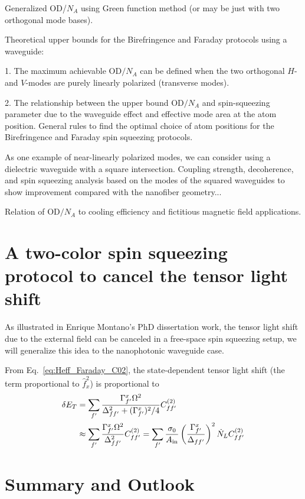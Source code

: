 \documentclass[preprint,aps,pra,onecolumn,superscriptaddress]{revtex4-1} %
\newcommand{\Ain}{A_{\rm in}}
\begin{document}
Generalized OD/$N_A$ using Green function method (or may be just with two orthogonal mode bases).

Theoretical upper bounds for the Birefringence and Faraday protocols using a waveguide:

1. The maximum achievable OD$ /N_A $ can be defined when the two orthogonal $ H $- and $ V $-modes are purely linearly polarized (transverse modes).

2. The relationship between the upper bound OD$ /N_A $ and spin-squeezing parameter due to the waveguide effect and effective mode area at the atom position. 
General rules to find the optimal choice of atom positions for the Birefringence and Faraday spin squeezing protocols.


As one example of near-linearly polarized modes, we can consider using a dielectric waveguide with a square intersection. 
Coupling strength, decoherence, and spin squeezing analysis based on the modes of the squared waveguides to show improvement compared with the nanofiber geometry...

Relation of OD$ /N_A $ to cooling efficiency and fictitious magnetic field applications.


\section{A two-color spin squeezing protocol to cancel the tensor light shift}
As illustrated in Enrique Montano's PhD dissertation work, the tensor light shift due to the external field can be canceled in a free-space spin squeezing setup, we will generalize this idea to the nanophotonic waveguide case.

From Eq.~\eqref{eq:Heff_Faraday_C02}, the state-dependent tensor light shift (the term proportional to $ \hat{f}_x^2 $) is proportional to 
\begin{align}
\delta E_T &= \sum_{f'} \frac{\Gamma_{f'}^x\Omega^2}{\Delta_{ff'}^2+(\Gamma_{f'}^x)^2/4}C_{ff'}^{(2)}\\
&\approx \sum_{f'}\frac{\Gamma_{f'}^x\Omega^2}{\Delta_{ff'}^2}C_{ff'}^{(2)} = \sum_{f'}\frac{\sigma_0}{\Ain}\left(\frac{\Gamma_{f'}^x}{\Delta_{ff'}} \right)^2 \dot{N}_L C_{ff'}^{(2)}
\end{align}



\section{Summary and Outlook} \label{Sec::Conclusion}
\end{document}
